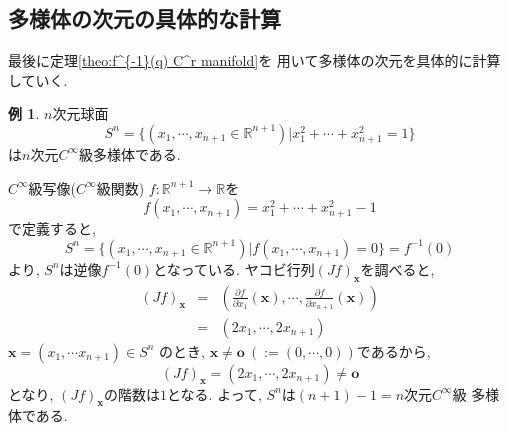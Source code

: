 \documentclass[a4j,12pt]{jarticle}
\theoremstyle{definition}
\newtheorem{example}[theorem]{例}
\begin{document}
\subsection{多様体の次元の具体的な計算}
最後に定理\ref{theo:f^{-1}(q) C^r manifold}を
用いて多様体の次元を具体的に計算していく. 
\begin{example}
    $n$次元球面
    $$S^n=\{(x_1,\cdots ,x_{n+1}\in 
    \mathbb{R}^{n+1})|x_1^2+\cdots +x_{n+1}^2=1\}$$
    は$n$次元$C^\infty$級多様体である. 

    $C^\infty$級写像($C^\infty$級関数)
    $f:\mathbb{R}^{n+1}\to \mathbb{R}$を
    $$f(x_1,\cdots ,x_{n+1})=
    x_1^2+\cdots +x_{n+1}^2-1$$
    で定義すると, 
    $$S^n=\{(x_1,\cdots ,x_{n+1}\in 
    \mathbb{R}^{n+1})|f(x_1,\cdots ,x_{n+1})=0\}
    =f^{-1}(0)$$
    より, $S^n$は逆像$f^{-1}(0)$となっている. 
    ヤコビ行列$(Jf)_{\boldsymbol{x}}$を調べると, 
    \begin{eqnarray*}
        (Jf)_{\boldsymbol{x}}&=&
    \left(\frac{\partial f}{\partial x_1}
    (\boldsymbol{x}), 
    \cdots ,\frac{\partial f}{\partial x_{n+1}}
    (\boldsymbol{x})\right)\\
    &=&(2x_1,\cdots ,2x_{n+1})
    \end{eqnarray*}
    $\boldsymbol{x}=(x_1,\cdots x_{n+1})\in S^n$
    のとき, $\boldsymbol{x}\neq \boldsymbol{o}
    \ (:=(0, \cdots ,0))$であるから, 
    $$(Jf)_{\boldsymbol{x}}=(2x_1,\cdots ,2x_{n+1})
    \neq \boldsymbol{o}$$
    となり, $(Jf)_{\boldsymbol{x}}$の階数は$1$となる. 
    よって, $S^n$は$(n+1)-1=n$次元$C^\infty$級
    多様体である. 
\end{example}
\end{document}
